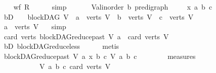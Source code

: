 \begin{isabellebody}
\ \ \isamarkupfalse%
\ {\isachardoublequoteopen}wf\ {\isacharquery}{\kern0pt}R{\isachardoublequoteclose}\isanewline
\ \ \ \ \isamarkupfalse%
\ simp\ \isanewline
{}\isamarkupfalse%
\ \isanewline
\ \ \isamarkupfalse%
\ V{\isacharcolon}{\kern0pt}{\isacharcolon}{\kern0pt}{\isachardoublequoteopen}{\isacharparenleft}{\kern0pt}{\isacharprime}{\kern0pt}a{\isacharcolon}{\kern0pt}{\isacharcolon}{\kern0pt}linorder{\isacharcomma}{\kern0pt}\ {\isacharprime}{\kern0pt}b{\isacharparenright}{\kern0pt}\ pre{\isacharunderscore}{\kern0pt}digraph{\isachardoublequoteclose}\ \isanewline
\ \ \isamarkupfalse%
\ x\ a\ b\ c\isanewline
\ \ \isamarkupfalse%
\ bD{\isacharcolon}{\kern0pt}\ {\isachardoublequoteopen}\ {\isasymnot}\ {\isacharparenleft}{\kern0pt}{\isasymnot}\ blockDAG\ V\ {\isasymor}\ a\ {\isasymnotin}\ verts\ V\ {\isasymor}\ b\ {\isasymnotin}\ verts\ V\ {\isasymor}\ c\ {\isasymnotin}\ verts\ V{\isacharparenright}{\kern0pt}{\isachardoublequoteclose}\isanewline
\ \ \isamarkupfalse%
\ \isamarkupfalse%
\ {\isachardoublequoteopen}a\ {\isasymin}\ verts\ V{\isachardoublequoteclose}\ \ \isamarkupfalse%
\ simp\isanewline
\ \ \isamarkupfalse%
\ \isamarkupfalse%
\ {\isachardoublequoteopen}card\ {\isacharparenleft}{\kern0pt}verts\ {\isacharparenleft}{\kern0pt}blockDAG{\isachardot}{\kern0pt}reduce{\isacharunderscore}{\kern0pt}past\ V\ a{\isacharparenright}{\kern0pt}{\isacharparenright}{\kern0pt}\ {\isacharless}{\kern0pt}\ card\ {\isacharparenleft}{\kern0pt}verts\ V{\isacharparenright}{\kern0pt}{\isachardoublequoteclose}\ \ \ \isanewline
\ \ \ \ \isamarkupfalse%
\ bD\ blockDAG{\isachardot}{\kern0pt}reduce{\isacharunderscore}{\kern0pt}less\isanewline
\ \ \ \ \isamarkupfalse%
\ metis\isanewline
\ \ \isamarkupfalse%
\ \isamarkupfalse%
\ {\isachardoublequoteopen}{\isacharparenleft}{\kern0pt}{\isacharparenleft}{\kern0pt}blockDAG{\isachardot}{\kern0pt}reduce{\isacharunderscore}{\kern0pt}past\ V\ a{\isacharcomma}{\kern0pt}\ x{\isacharcomma}{\kern0pt}\ b{\isacharcomma}{\kern0pt}\ c{\isacharparenright}{\kern0pt}{\isacharcomma}{\kern0pt}\ V{\isacharcomma}{\kern0pt}\ a{\isacharcomma}{\kern0pt}\ b{\isacharcomma}{\kern0pt}\ c{\isacharparenright}{\kern0pt}\isanewline
\ \ \ \ \ \ \ {\isasymin}\ measures\isanewline
\ \ \ \ \ \ \ \ \ \ \ {\isacharbrackleft}{\kern0pt}{\isasymlambda}{\isacharparenleft}{\kern0pt}V{\isacharcomma}{\kern0pt}\ a{\isacharcomma}{\kern0pt}\ b{\isacharcomma}{\kern0pt}\ c{\isacharparenright}{\kern0pt}{\isachardot}{\kern0pt}\ card\ {\isacharparenleft}{\kern0pt}verts\ V{\isacharparenright}{\kern0pt}{\isacharcomma}{\kern0pt}\isanewline

\end{isabellebody}
